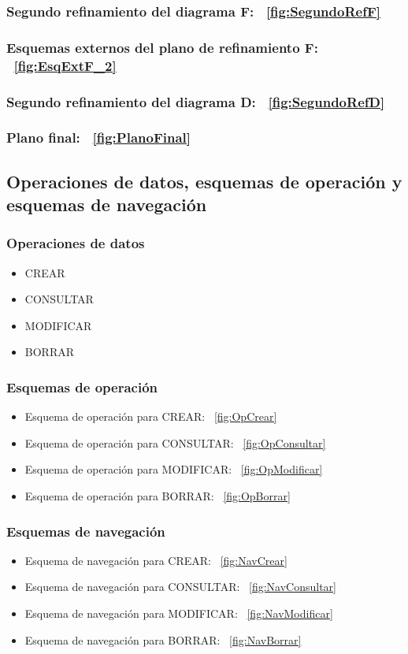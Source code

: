 \documentclass[paper=a4, fontsize=11pt, spanish]{scrartcl}
\begin{document}
\subsubsection* {Segundo refinamiento del diagrama F: ~\ref{fig:SegundoRefF}}
\subsubsection* {Esquemas externos del plano de refinamiento F: ~\ref{fig:EsqExtF_2}}
\subsubsection* {Segundo refinamiento del diagrama D: ~\ref{fig:SegundoRefD}}
\subsubsection* {Plano final:
~\ref{fig:PlanoFinal}}

\subsection{Operaciones de datos, esquemas de operación y esquemas de navegación}
\subsubsection{Operaciones de datos}
\begin{itemize}
    \item CREAR
    \item CONSULTAR
    \item MODIFICAR
    \item BORRAR
\end{itemize}

\subsubsection{Esquemas de operación}
\begin{itemize}
\item Esquema de operación para CREAR: ~\ref{fig:OpCrear}
\item Esquema de operación para CONSULTAR: ~\ref{fig:OpConsultar}
\item Esquema de operación para MODIFICAR: ~\ref{fig:OpModificar}
\item Esquema de operación para BORRAR: ~\ref{fig:OpBorrar}
\end{itemize}

\subsubsection{Esquemas de navegación}
\begin{itemize}
\item Esquema de navegación para CREAR: ~\ref{fig:NavCrear}
\item Esquema de navegación para CONSULTAR: ~\ref{fig:NavConsultar}
\item Esquema de navegación para MODIFICAR: ~\ref{fig:NavModificar}
\item Esquema de navegación para BORRAR: ~\ref{fig:NavBorrar}
\end{itemize}
\end{document}
